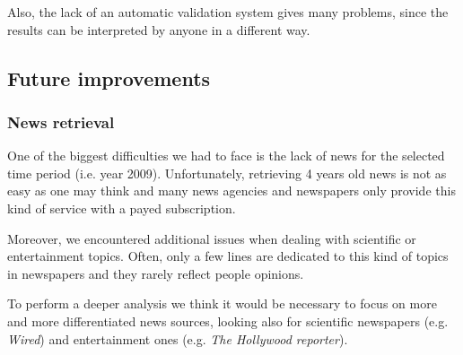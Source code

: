 Also, the lack of an automatic validation system gives many problems, since the
results can be interpreted by anyone in a different way.

\subsection*{Future improvements}
\subsubsection*{News retrieval}
One of the biggest difficulties we had to face is the lack of news for the
selected time period (i.e. year 2009). Unfortunately, retrieving 4 years old
news is not as easy as one may think and many news agencies and newspapers only
provide this kind of service with a payed subscription.

Moreover, we encountered additional issues when dealing with scientific or
entertainment topics. Often, only a few lines are dedicated to this kind of
topics in newspapers and they rarely reflect people opinions.

To perform a deeper analysis we think it would be necessary to focus on more and
more differentiated news sources, looking also for scientific newspapers (e.g.
\emph{Wired}) and entertainment ones (e.g. \emph{The Hollywood reporter}).

